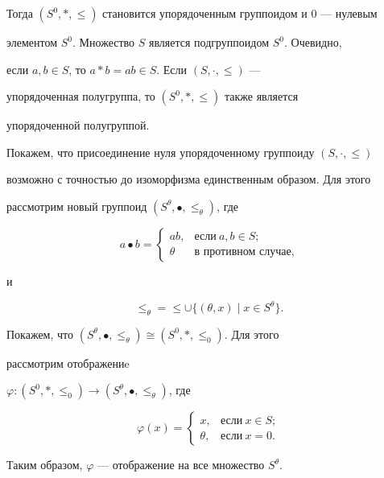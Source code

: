 Тогда $(S^0,*,\le)$ становится упорядоченным группоидом и 0 --- нулевым 


элементом $S^0$. Множество $S$ является подгруппоидом $S^0$. Очевидно,


если $a,b\in S$, то $a* b=ab\in S$. Если $(S,\cdot,\le)$ --- 


упорядоченная полугруппа, то $(S^0,*,\le)$ также является 


упорядоченной полугруппой. 


 


Покажем, что присоединение нуля упорядоченному группоиду $(S,\cdot,\le)$ 


возможно с точностью до изоморфизма единственным образом. Для этого 


рассмотрим новый группоид $(S^\theta,\bullet,\le_\theta)$, где 


$$ 


a\bullet b= 


\begin{cases} 


ab, & \text{если} \ a,b\in S;\\ 


\theta & \text{в противном случае,} 


\end{cases} 


$$ 


и 


$$ 


\le_\theta=\le\cup\{(\theta,x)\mid x\in S^\theta\}. 


$$ 


Покажем, что $(S^\theta,\bullet,\le_\theta)\cong(S^0,*,\le_0)$. Для этого 


рассмотрим отображениe 


$\varphi:(S^0,*,\le_0)\to(S^\theta,\bullet,\le_\theta)$, где 


$$ 


\varphi(x)=\begin{cases} 


x, & \text{если} \ x\in S;\\ 


\theta, & \text{если} \ x=0. 


\end{cases} 


$$ 


Таким образом, $\varphi$ --- отображение на все множество $S^\theta$. 


